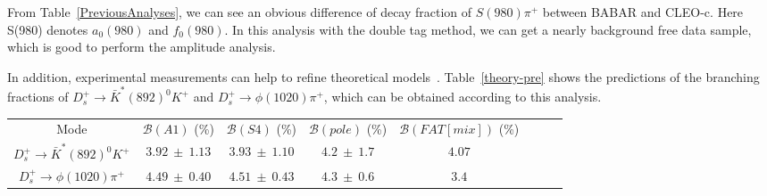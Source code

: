 \documentclass[aps,prd,twocolumn,showpacs,amsmath,amssymb]{revtex4-1}
\begin{document}
    From Table~\ref{PreviousAnalyses}, we can see an obvious difference of decay fraction of $S(980)\pi^{+}$ between BABAR and CLEO-c. 
    Here S(980) denotes $a_{0}(980)$ and $f_{0}(980)$.
    In this analysis with the double tag method, we can get a nearly background free data sample, which is good to perform the amplitude analysis.

    In addition, experimental measurements can help to refine theoretical models~\cite{PRD93-114010}.
    Table~\ref{theory-pre} shows the predictions of the branching fractions of $D_{s}^{+} \rightarrow \bar{K}^{*}(892)^{0}K^{+}$ and $D_{s}^{+} \rightarrow \phi(1020)\pi^{+}$, which can be obtained according to this analysis.
    \begin{table*}[htbp]
        \caption{
            $\mathcal{B}(A1)$, $\mathcal{B}(S4)$, $\mathcal{B}(pole)$ and $\mathcal{B}(FAT[mix])$ are 4 theory predictions~\cite{PRD93-114010}. 
        }
        \label{theory-pre}
        \begin{center}
            \begin{tabular}{cccccccc}
                \hline\hline
                Mode &  $\mathcal{B}(A1)$ (\%)& $\mathcal{B}(S4)$ (\%)&  $\mathcal{B}(pole)$ (\%)&$\mathcal{B}(FAT[mix])$ (\%)&\\
                $D_{s}^{+} \rightarrow \bar{K}^{*}(892)^{0}K^{+}$           & $3.92\ \pm\ 1.13$  & $3.93\ \pm\ 1.10$  & $4.2\ \pm\ 1.7$  & $4.07$  \\
                $D_{s}^{+} \rightarrow \phi(1020)\pi^{+}$                   & $4.49\ \pm\ 0.40$  & $4.51\ \pm\ 0.43$  & $4.3\ \pm\ 0.6$  & $3.4$  \\
                \hline
                \hline\hline
            \end{tabular}
        \end{center}
    \end{table*}

\end{document}

